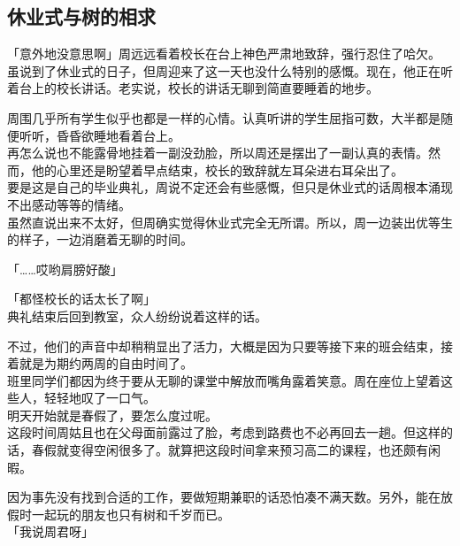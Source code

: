 \subsection{休业式与树的相求}

「意外地没意思啊」周远远看着校长在台上神色严肃地致辞，强行忍住了哈欠。\\

虽说到了休业式的日子，但周迎来了这一天也没什么特别的感慨。现在，他正在听着台上的校长讲话。老实说，校长的讲话无聊到简直要睡着的地步。

周围几乎所有学生似乎也都是一样的心情。认真听讲的学生屈指可数，大半都是随便听听，昏昏欲睡地看着台上。\\

再怎么说也不能露骨地挂着一副没劲脸，所以周还是摆出了一副认真的表情。然而，他的心里还是盼望着早点结束，校长的致辞就左耳朵进右耳朵出了。\\

要是这是自己的毕业典礼，周说不定还会有些感慨，但只是休业式的话周根本涌现不出感动等等的情绪。\\

虽然直说出来不太好，但周确实觉得休业式完全无所谓。所以，周一边装出优等生的样子，一边消磨着无聊的时间。\\

\vspace{2\baselineskip}

「……哎哟肩膀好酸」

「都怪校长的话太长了啊」\\

典礼结束后回到教室，众人纷纷说着这样的话。

不过，他们的声音中却稍稍显出了活力，大概是因为只要等接下来的班会结束，接着就是为期约两周的自由时间了。\\

班里同学们都因为终于要从无聊的课堂中解放而嘴角露着笑意。周在座位上望着这些人，轻轻地叹了一口气。\\

明天开始就是春假了，要怎么度过呢。\\

这段时间周姑且也在父母面前露过了脸，考虑到路费也不必再回去一趟。但这样的话，春假就变得空闲很多了。就算把这段时间拿来预习高二的课程，也还颇有闲暇。

因为事先没有找到合适的工作，要做短期兼职的话恐怕凑不满天数。另外，能在放假时一起玩的朋友也只有树和千岁而已。\\

「我说周君呀」\\

